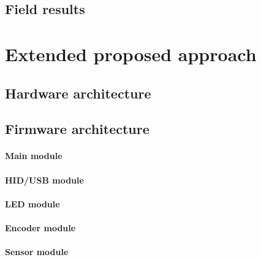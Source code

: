 \documentclass[a4paper,10pt]{article}
\begin{document}
\begin{multicols}{2}
\TODO


\subsection{Field results}

\TODO


\section{Extended proposed approach}

\TODO


\subsection{Hardware architecture}

\TODO


\subsection{Firmware architecture}

\TODO


\paragraph{Main module}
\TODO


\paragraph{HID/USB module}
\TODO


\paragraph{LED module}
\TODO


\paragraph{Encoder module}
\TODO


\paragraph{Sensor module}
\TODO



\end{multicols}
\end{document}
